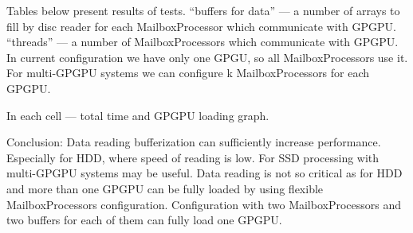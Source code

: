 Tables below present results of tests. 
``buffers for data'' --- a number of arrays to fill by disc reader for each MailboxProcessor which communicate with GPGPU.
``threads'' --- a number of MailboxProcessors which communicate with GPGPU.
In current configuration we have  only one GPGU, so all MailboxProcessors use it.
For multi-GPGPU systems  we can configure k MailboxProcessors for each GPGPU.
 
In each cell  --- total time and GPGPU loading graph.

Conclusion:
Data reading bufferization can sufficiently increase performance.
Especially for HDD, where speed of reading is low.  
For SSD processing with multi-GPGPU systems may be useful.
Data reading is not so critical as for HDD and more than one GPGPU can be fully loaded by using flexible MailboxProcessors configuration.
Configuration with two MailboxProcessors and two buffers for each of them can fully load one GPGPU.




